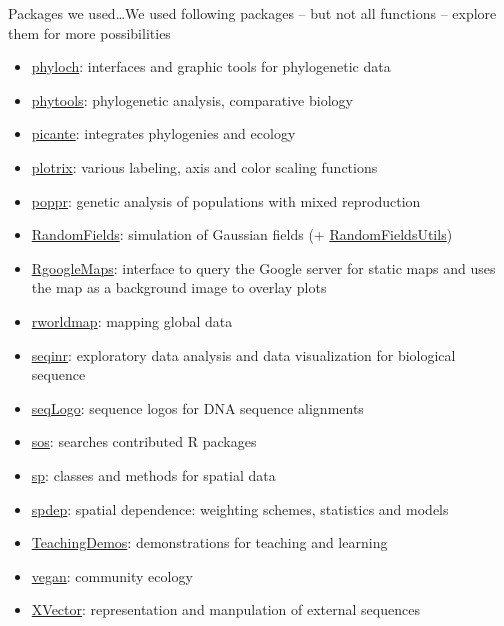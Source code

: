 \documentclass[compress, ucs, xelatex, 11pt, xcolor=svgnames,
  hyperref={
    bookmarks=true,
    unicode=true,
    colorlinks=true,
    pdftitle={Molecular data in R},
    plainpages=false,
    pdfauthor={Vojtech Zeisek},
    pdfsubject={Course about phylogeny and evolution in R},
    pdfcreator={XeLaTeX},
    pdfkeywords={R, evolution, phylogeny, molecular data},
    linkcolor=Tomato,
    anchorcolor=SaddleBrown,
    citecolor=Goldenrod,
    filecolor=DarkMagenta,
    menucolor=Sienna,
    urlcolor=DarkTurquoise,
    pdftex},
  url={hyphens, lowtilde} %
  ]{beamer}
\begin{document}
\begin{frame}[allowframebreaks]{Packages we used\ldots}{We used following packages -- but not all functions -- explore them for more possibilities}
\begin{itemize}
    \item \href{http://www.christophheibl.de/Rpackages.html}{phyloch}: interfaces and graphic tools for phylogenetic data
    \item \href{https://cran.r-project.org/package=phytools}{phytools}: phylogenetic analysis, comparative biology
    \item \href{https://cran.r-project.org/package=picante}{picante}: integrates phylogenies and ecology
    \item \href{https://cran.r-project.org/package=plotrix}{plotrix}: various labeling, axis and color scaling functions
    \item \href{https://cran.r-project.org/package=poppr}{poppr}: genetic analysis of populations with mixed reproduction
    \item \href{https://cran.r-project.org/package=RandomFields}{RandomFields}: simulation of Gaussian fields (+ \href{https://cran.r-project.org/package=RandomFieldsUtils}{RandomFieldsUtils})
    \item \href{https://cran.r-project.org/package=RgoogleMaps}{RgoogleMaps}: interface to query the Google server for static maps and uses the map as a background image to overlay plots
    \item \href{https://cran.r-project.org/package=rworldmap}{rworldmap}: mapping global data
    \item \href{https://cran.r-project.org/package=seqinr}{seqinr}: exploratory data analysis and data visualization for biological sequence
    \item \href{https://www.bioconductor.org/packages/release/bioc/html/seqLogo.html}{seqLogo}: sequence logos for DNA sequence alignments
    \item \href{https://cran.r-project.org/package=sos}{sos}: searches contributed R packages
    \item \href{https://cran.r-project.org/package=sp}{sp}: classes and methods for spatial data
    \item \href{https://cran.r-project.org/package=spdep}{spdep}: spatial dependence: weighting schemes, statistics and models
    \item \href{https://cran.r-project.org/package=TeachingDemos}{TeachingDemos}: demonstrations for teaching and learning
    \item \href{https://cran.r-project.org/package=vegan}{vegan}: community ecology
    \item \href{https://www.bioconductor.org/packages/3.4/bioc/html/XVector.html}{XVector}: representation and manpulation of external sequences
  \end{itemize}
\end{frame}
\end{document}
